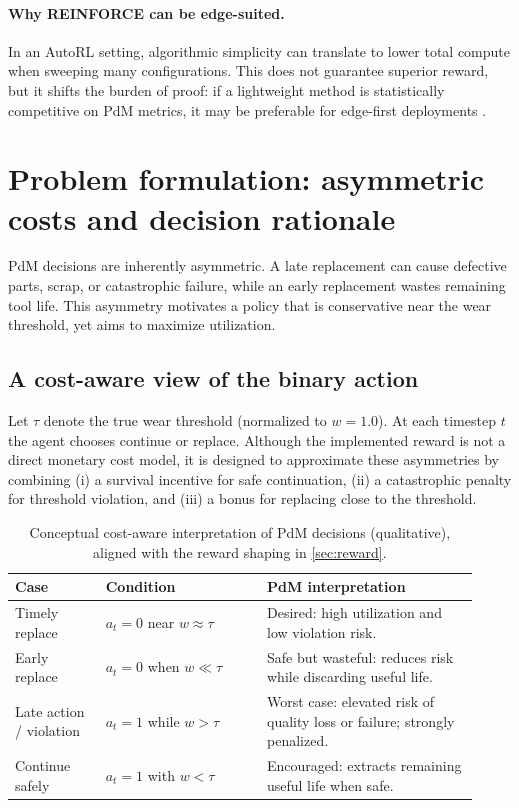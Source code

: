 \documentclass[11pt]{article}
\begin{document}
\paragraph{Why REINFORCE can be edge-suited.}
In an AutoRL setting, algorithmic simplicity can translate to lower total compute when sweeping many configurations. This does not guarantee superior reward, but it shifts the burden of proof: if a lightweight method is statistically competitive on PdM metrics, it may be preferable for edge-first deployments \parencite{Schwartz2020GreenAI, Njor2024TinyML}.

\section{Problem formulation: asymmetric costs and decision rationale}
\label{sec:problem}
PdM decisions are inherently asymmetric. A late replacement can cause defective parts, scrap, or catastrophic failure, while an early replacement wastes remaining tool life. This asymmetry motivates a policy that is conservative near the wear threshold, yet aims to maximize utilization.

\subsection{A cost-aware view of the binary action}
Let $\tau$ denote the true wear threshold (normalized to $w=1.0$). At each timestep $t$ the agent chooses continue or replace. Although the implemented reward is not a direct monetary cost model, it is designed to approximate these asymmetries by combining (i) a survival incentive for safe continuation, (ii) a catastrophic penalty for threshold violation, and (iii) a bonus for replacing close to the threshold.

\begin{table}[t]
	\centering
	\caption{Conceptual cost-aware interpretation of PdM decisions (qualitative), aligned with the reward shaping in \cref{sec:reward}.}
	\label{tab:cost_view}
	\begin{tabular}{p{0.18\linewidth} p{0.32\linewidth} p{0.42\linewidth}}
		\toprule
		\rowcolor{gray!20} \textbf{Case} & \textbf{Condition} & \textbf{PdM interpretation}\\
		\midrule
		Timely replace & $a_t=0$ near $w\approx\tau$ & Desired: high utilization and low violation risk.\\
		Early replace & $a_t=0$ when $w\ll\tau$ & Safe but wasteful: reduces risk while discarding useful life.\\
		Late action / violation & $a_t=1$ while $w>\tau$ & Worst case: elevated risk of quality loss or failure; strongly penalized.\\
		Continue safely & $a_t=1$ with $w<\tau$ & Encouraged: extracts remaining useful life when safe.\\
		\bottomrule
	\end{tabular}
\end{table}
\end{document}
